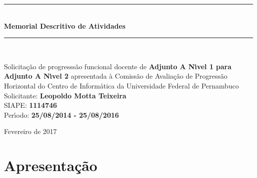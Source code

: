 \documentclass[a4paper,oneside,10pt]{article}
\begin{document}
\begin{titlepage}

\vspace{-5.0cm}


\begin{center}
\vspace{1cm}
\rule{1.0\textwidth}{1pt} \\ [0.5cm]
{\Huge \textbf{\textsf{Memorial Descritivo de Atividades}}} \\
\rule{1.0\textwidth}{1pt} \\
\vspace{2cm}

\doublespacing
{\Large \textsf{Solicita\c{c}\~{a}o de progresss\~{a}o funcional docente de \textbf{Adjunto A N\'{\i}vel 1 para Adjunto A N\'{\i}vel 2} apresentada \`{a} Comiss\~{a}o de Avalia\c{c}\~{a}o de Progress\~{a}o Horizontal do Centro de Inform\'{a}tica da Universidade Federal de Pernambuco}}\\
\vspace{1.5cm}
{\LARGE \textsf{Solicitante: \textbf{Leopoldo Motta Teixeira}}}\\
\vspace{0.5cm}
{\Large \textsf{SIAPE: \textbf{1114746}}} \\
\vspace{0.5cm}
{\Large \textsf{Per\'{\i}odo: \textbf{25/08/2014 - 25/08/2016}}} \\

\vspace{2.0cm}

\normalsize \textsf{Fevereiro de 2017}

\end{center}
\thispagestyle{empty}
\end{titlepage}


\tableofcontents


\newpage
\section*{Apresenta\c{c}\~{a}o}
\vspace{0.3cm}
\end{document}
